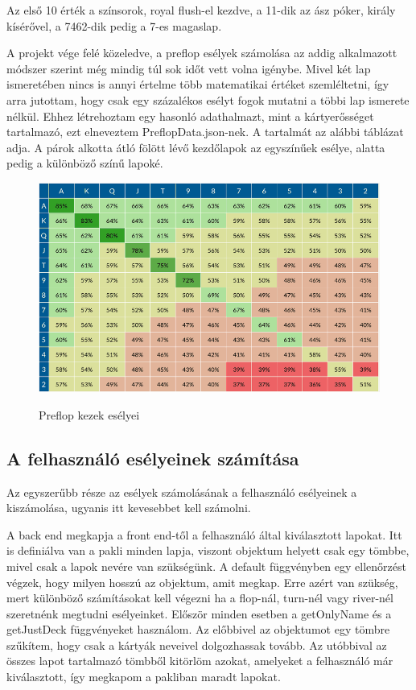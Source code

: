 Az első 10 érték a színsorok, royal flush-el kezdve, a 11-dik az ász póker, király kísérővel, a 7462-dik pedig a 7-es magaslap.

A projekt vége felé közeledve, a preflop esélyek számolása az addig alkalmazott módszer szerint még mindig túl sok időt vett volna igénybe. Mivel két lap ismeretében nincs is annyi értelme több matematikai értéket szemléltetni, így arra jutottam, hogy csak egy százalékos esélyt fogok mutatni a többi lap ismerete nélkül. Ehhez létrehoztam egy hasonló adathalmazt, mint a kártyerősséget tartalmazó, ezt elneveztem PreflopData.json-nek. A tartalmát az alábbi táblázat adja. A párok alkotta átló fölött lévő kezdőlapok az egyszínűek esélye, alatta pedig a különböző színű lapoké.

\begin{figure}[h]
\centering
\includegraphics[scale=0.5]{images/preflop-chances.png}
\caption{Preflop kezek esélyei}
\cite{preflop-chances}
\label{fig:preflop-chances}
\end{figure}

\subsection{A felhasználó esélyeinek számítása}
Az egyszerűbb része az esélyek számolásának a felhasználó esélyeinek a kiszámolása, ugyanis itt kevesebbet kell számolni. 

A back end megkapja a front end-től a felhasználó által kiválasztott lapokat. Itt is definiálva van a pakli minden lapja, viszont objektum helyett csak egy tömbbe, mivel csak a lapok nevére van szükségünk. A default függvényben egy ellenőrzést végzek, hogy milyen hosszú az objektum, amit megkap. Erre azért van szükség, mert különböző számításokat kell végezni ha a flop-nál, turn-nél vagy river-nél szeretnénk megtudni esélyeinket. Először minden esetben a getOnlyName és a getJustDeck függvényeket használom. Az előbbivel az objektumot egy tömbre szűkítem, hogy csak a kártyák neveivel dolgozhassak tovább. Az utóbbival az összes lapot tartalmazó tömbből kitörlöm azokat, amelyeket a felhasználó már kiválasztott, így megkapom a pakliban maradt lapokat.

